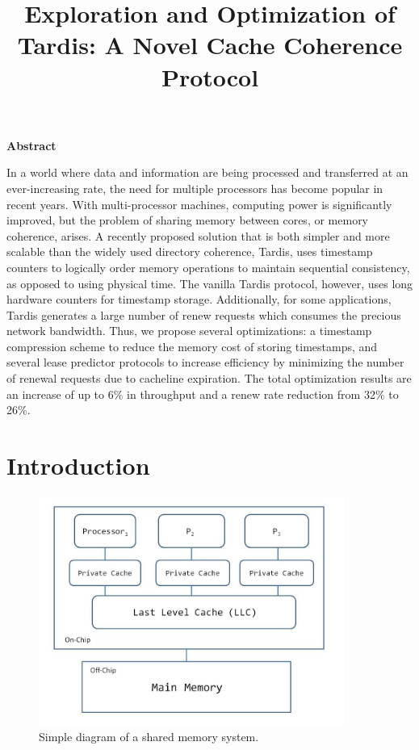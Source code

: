 \documentclass[12pt]{article}
\title{Exploration and Optimization of Tardis: A Novel Cache Coherence Protocol}
\date{}
\begin{document}
	\maketitle
\begin{center}
\textbf{Abstract}
\end{center}

\justify
In a world where data and information are being processed and transferred at an ever-increasing rate, the need for multiple processors has become popular in recent years. With multi-processor machines, computing power is significantly improved, but the problem of sharing memory between cores, or memory coherence, arises. A recently proposed solution that is both simpler and more scalable than the widely used directory coherence, Tardis, uses timestamp counters to logically order memory operations to maintain sequential consistency, as opposed to using physical time. The vanilla Tardis protocol, however, uses long hardware counters for timestamp storage. Additionally, for some applications, Tardis generates a large number of renew requests which consumes the precious network bandwidth. Thus, we propose several optimizations: a timestamp compression scheme to reduce the memory cost of storing timestamps, and several lease predictor protocols to increase efficiency by minimizing the number of renewal requests due to cacheline expiration. The total optimization results are an increase of up to 6\% in throughput and a renew rate reduction from 32\% to 26\%.



\section{Introduction}

\begin{figure}
\begin{center}
  \includegraphics[width=10cm]{distributed_system.JPG}
  \caption{Simple diagram of a shared memory system.}
  \label{fig:distributed}
\end{center}
\end{figure}
\end{document}

